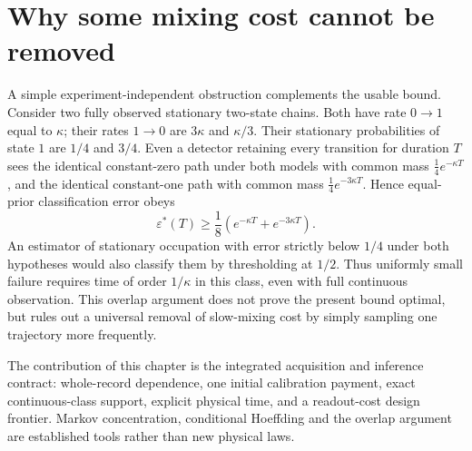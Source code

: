 \section{Why some mixing cost cannot be removed}
A simple experiment-independent obstruction complements the usable bound.
Consider two fully observed stationary two-state chains. Both have rate
$0\to1$ equal to $\kappa$; their rates $1\to0$ are $3\kappa$ and
$\kappa/3$. Their stationary probabilities of state $1$ are $1/4$ and $3/4$.
Even a detector retaining every transition for duration $T$ sees the identical
constant-zero path under both models with common mass
$\tfrac14 e^{-\kappa T}$, and the identical constant-one path with common
mass $\tfrac14 e^{-3\kappa T}$. Hence equal-prior classification error obeys
\begin{equation}
 \varepsilon^*(T)\geq\frac18
 \left(e^{-\kappa T}+e^{-3\kappa T}\right).
 \label{eq:ci-slow-mixing-lower}
\end{equation}
An estimator of stationary occupation with error strictly below $1/4$ under
both hypotheses would also classify them by thresholding at $1/2$. Thus
uniformly small failure requires time of order $1/\kappa$ in this class, even
with full continuous observation. This overlap argument does not prove the
present bound optimal, but rules out a universal removal of slow-mixing cost
by simply sampling one trajectory more frequently.

The contribution of this chapter is the integrated acquisition and inference
contract: whole-record dependence, one initial calibration payment, exact
continuous-class support, explicit physical time, and a readout-cost design
frontier. Markov concentration, conditional Hoeffding and the overlap argument
are established tools rather than new physical laws.

